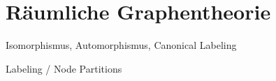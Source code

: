 \chapter{Räumliche Graphentheorie}

Isomorphismus, Automorphismus, Canonical Labeling

Labeling / Node Partitions
